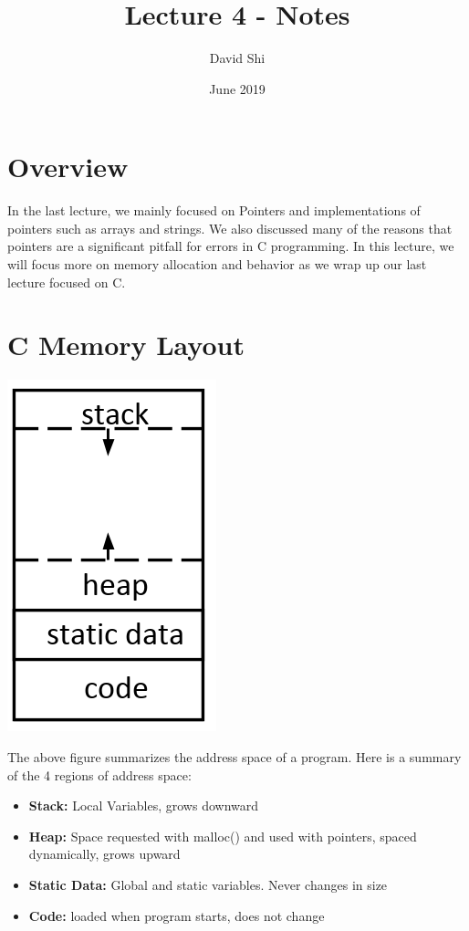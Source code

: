 \documentclass[letterpaper]{article}
\title{Lecture 4 - Notes}
\author{David Shi}
\date{June 2019}
\theoremstyle{remark}
\begin{document}
\maketitle

\section{Overview}
In the last lecture, we mainly focused on Pointers and implementations of pointers such as arrays and strings. We also discussed many of the reasons that pointers are a significant pitfall for errors in C programming. In this lecture, we will focus more on memory allocation and behavior as we wrap up our last lecture focused on C.

\section{C Memory Layout}
\begin{center}
    \includegraphics[scale=.5]{memorylayout}
\end{center}
The above figure summarizes the address space of a program. Here is a summary of the 4 regions of address space:
\begin{itemize}
    \item \textbf{Stack:} Local Variables, grows downward
    \item \textbf{Heap:} Space requested with malloc() and used with pointers, spaced dynamically, grows upward
    \item \textbf{Static Data:} Global and static variables. Never changes in size
    \item \textbf{Code:} loaded when program starts, does not change
\end{itemize}
\end{document}
